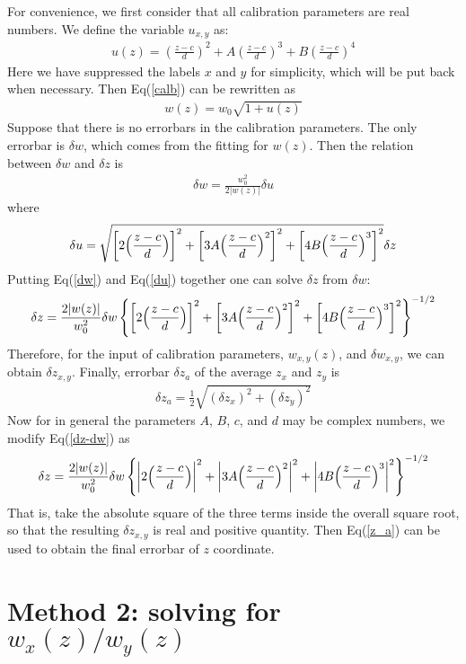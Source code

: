 \documentclass[12pt]{article}
\def\bea{\begin{eqnarray}}
\def\eea{\end{eqnarray}}
\def\Eq#1{Eq(\ref{#1})}
\begin{document}
For convenience, we first consider that all calibration parameters are
real numbers. We define the variable $u_{x,y}$ as:
\bea\label{u(z)}
u(z) = \left(\frac{z-c}{d}\right)^2 +
	A\left(\frac{z-c}{d}\right)^3 +
	B\left(\frac{z-c}{d}\right)^4
\eea
Here we have suppressed the labels $x$ and $y$ for simplicity, which will
be put back when necessary. Then \Eq{calb} can be rewritten as
\bea
w(z) = w_0 \sqrt{1+u(z)}
\eea
Suppose that there is no errorbars in the calibration parameters.
The only errorbar is $\delta w$, which comes from the fitting
for $w(z)$. Then the relation between $\delta w$ and $\delta z$ is
\bea\label{dw}
\delta w = \frac{w_0^2}{2 |w(z)|} \delta u
\eea
where
\bea\label{du}
\delta u = \sqrt{ \left[2\Bigl(\frac{z-c}{d}\Bigr)\right]^2 +
		  \left[3A\Bigl(\frac{z-c}{d}\Bigr)^2\right]^2 +
		  \left[4B\Bigl(\frac{z-c}{d}\Bigr)^3\right]^2 }\delta z
\eea
Putting \Eq{dw} and \Eq{du} together one can solve $\delta z$ from $\delta w$:
\bea\label{dz-dw}
\delta z = \frac{2 |w(z)|}{w_0^2} \delta w \left\{
	\left[2\Bigl(\frac{z-c}{d}\Bigr)\right]^2 +
	\left[3A\Bigl(\frac{z-c}{d}\Bigr)^2\right]^2 +
	\left[4B\Bigl(\frac{z-c}{d}\Bigr)^3\right]^2 \right\}^{-1/2}
\eea
Therefore, for the input of calibration parameters, $w_{x,y}(z)$,
and $\delta w_{x,y}$, we can obtain $\delta z_{x,y}$. Finally, errorbar
$\delta z_a$ of the average $z_x$ and $z_y$ is
\bea\label{z_a}
\delta z_a = \frac{1}{2} \sqrt{(\delta z_x)^2 + (\delta z_y)^2}
\eea
Now for in general the parameters $A$, $B$, $c$, and $d$ may be complex
numbers, we modify \Eq{dz-dw} as
\bea\label{dz-dw-abs}
\delta z = \frac{2 |w(z)|}{w_0^2} \delta w \left\{
	\left|2\Bigl(\frac{z-c}{d}\Bigr)\right|^2 +
	\left|3A\Bigl(\frac{z-c}{d}\Bigr)^2\right|^2 +
	\left|4B\Bigl(\frac{z-c}{d}\Bigr)^3\right|^2 \right\}^{-1/2}
\eea
That is, take the absolute square of the three terms inside the overall
square root, so that the resulting $\delta z_{x,y}$ is real and positive
quantity. Then \Eq{z_a} can be used to obtain the final errorbar of $z$
coordinate.

\section{Method 2: solving for $w_x(z)/w_y(z)$}
\end{document}
